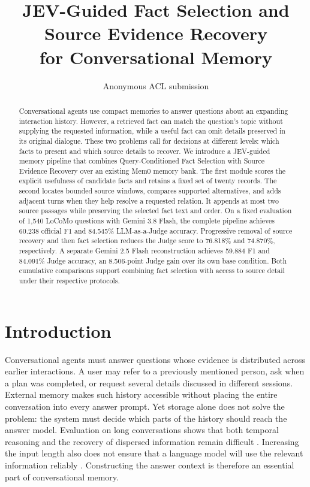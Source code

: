 \documentclass[11pt]{article}
\title{JEV-Guided Fact Selection and Source Evidence Recovery\\
for Conversational Memory}
\author{Anonymous ACL submission}
\begin{document}
\maketitle

\begin{abstract}
Conversational agents use compact memories to answer questions about an expanding interaction history. However, a retrieved fact can match the question's topic without supplying the requested information, while a useful fact can omit details preserved in its original dialogue. These two problems call for decisions at different levels: which facts to present and which source details to recover. We introduce a JEV-guided memory pipeline that combines Query-Conditioned Fact Selection with Source Evidence Recovery over an existing Mem0 memory bank. The first module scores the explicit usefulness of candidate facts and retains a fixed set of twenty records. The second locates bounded source windows, compares supported alternatives, and adds adjacent turns when they help resolve a requested relation. It appends at most two source passages while preserving the selected fact text and order. On a fixed evaluation of 1,540 LoCoMo questions with Gemini 3.8 Flash, the complete pipeline achieves 60.238 official F1 and 84.545\% LLM-as-a-Judge accuracy. Progressive removal of source recovery and then fact selection reduces the Judge score to 76.818\% and 74.870\%, respectively. A separate Gemini 2.5 Flash reconstruction achieves 59.884 F1 and 84.091\% Judge accuracy, an 8.506-point Judge gain over its own base condition. Both cumulative comparisons support combining fact selection with access to source detail under their respective protocols.
\end{abstract}

\section{Introduction}
Conversational agents must answer questions whose evidence is distributed across earlier interactions. A user may refer to a previously mentioned person, ask when a plan was completed, or request several details discussed in different sessions. External memory makes such history accessible without placing the entire conversation into every answer prompt. Yet storage alone does not solve the problem: the system must decide which parts of the history should reach the answer model. Evaluation on long conversations shows that both temporal reasoning and the recovery of dispersed information remain difficult \citep{maharana-etal-2024-evaluating}. Increasing the input length also does not ensure that a language model will use the relevant information reliably \citep{liu-etal-2024-lost}. Constructing the answer context is therefore an essential part of conversational memory.
\end{document}
